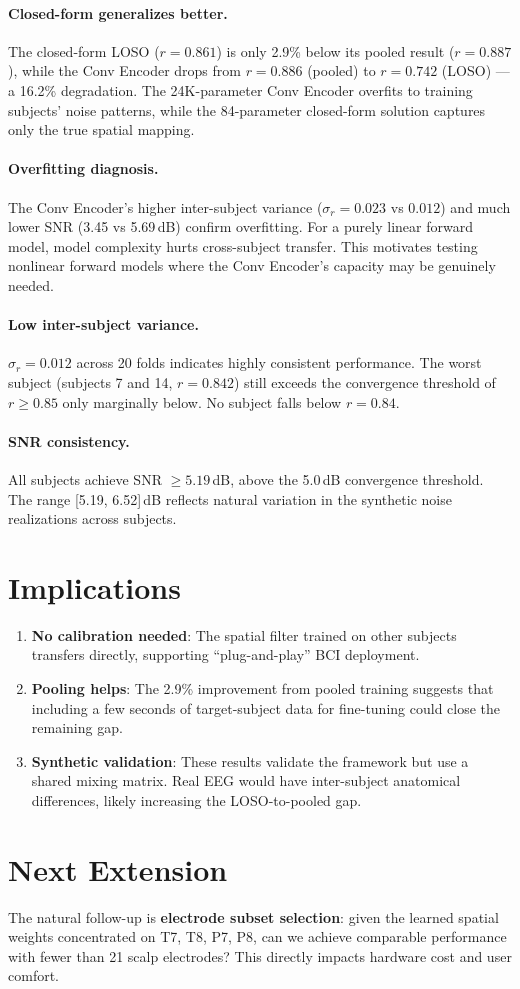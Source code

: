 \documentclass[11pt,a4paper]{article}
\begin{document}
\paragraph{Closed-form generalizes better.}
The closed-form LOSO ($r=0.861$) is only 2.9\% below its pooled result
($r=0.887$), while the Conv Encoder drops from $r=0.886$ (pooled) to
$r=0.742$ (LOSO) --- a 16.2\% degradation. The 24K-parameter Conv Encoder
overfits to training subjects' noise patterns, while the 84-parameter
closed-form solution captures only the true spatial mapping.

\paragraph{Overfitting diagnosis.}
The Conv Encoder's higher inter-subject variance ($\sigma_r = 0.023$ vs
$0.012$) and much lower SNR (3.45 vs 5.69\,dB) confirm overfitting.
For a purely linear forward model, model complexity hurts cross-subject
transfer. This motivates testing nonlinear forward models where the
Conv Encoder's capacity may be genuinely needed.

\paragraph{Low inter-subject variance.}
$\sigma_r = 0.012$ across 20 folds indicates highly consistent
performance. The worst subject (subjects 7 and 14, $r=0.842$) still
exceeds the convergence threshold of $r \geq 0.85$ only marginally
below. No subject falls below $r=0.84$.

\paragraph{SNR consistency.}
All subjects achieve SNR $\geq 5.19$\,dB, above the 5.0\,dB convergence
threshold. The range [5.19, 6.52]\,dB reflects natural variation in
the synthetic noise realizations across subjects.

\section{Implications}

\begin{enumerate}
  \item \textbf{No calibration needed}: The spatial filter trained on other
    subjects transfers directly, supporting ``plug-and-play'' BCI deployment.

  \item \textbf{Pooling helps}: The 2.9\% improvement from pooled training
    suggests that including a few seconds of target-subject data for fine-tuning
    could close the remaining gap.

  \item \textbf{Synthetic validation}: These results validate the framework
    but use a shared mixing matrix. Real EEG would have inter-subject
    anatomical differences, likely increasing the LOSO-to-pooled gap.
\end{enumerate}

\section{Next Extension}

The natural follow-up is \textbf{electrode subset selection}: given the
learned spatial weights concentrated on T7, T8, P7, P8, can we achieve
comparable performance with fewer than 21 scalp electrodes? This directly
impacts hardware cost and user comfort.
\end{document}
